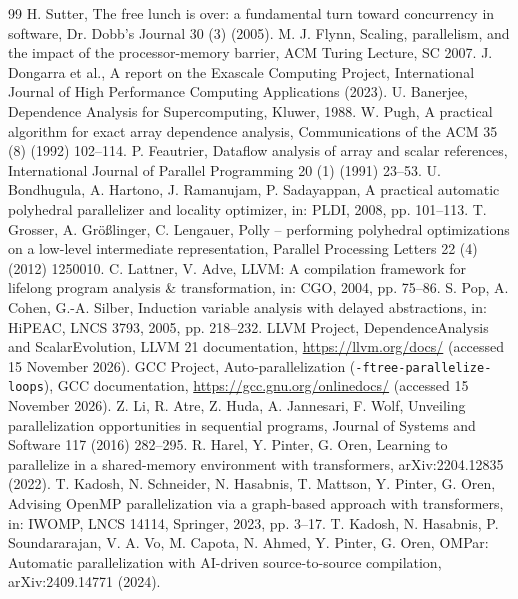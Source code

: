 
\begin{thebibliography}{99}
 H. Sutter, The free lunch is over: a fundamental turn toward concurrency in software, Dr. Dobb's Journal 30 (3) (2005).
 M. J. Flynn, Scaling, parallelism, and the impact of the processor-memory barrier, ACM Turing Lecture, SC 2007.
 J. Dongarra et al., A report on the Exascale Computing Project, International Journal of High Performance Computing Applications (2023).
 U. Banerjee, Dependence Analysis for Supercomputing, Kluwer, 1988.
 W. Pugh, A practical algorithm for exact array dependence analysis, Communications of the ACM 35 (8) (1992) 102--114.
 P. Feautrier, Dataflow analysis of array and scalar references, International Journal of Parallel Programming 20 (1) (1991) 23--53.
 U. Bondhugula, A. Hartono, J. Ramanujam, P. Sadayappan, A practical automatic polyhedral parallelizer and locality optimizer, in: PLDI, 2008, pp. 101--113.
 T. Grosser, A. Gr\"o{\ss}linger, C. Lengauer, Polly -- performing polyhedral optimizations on a low-level intermediate representation, Parallel Processing Letters 22 (4) (2012) 1250010.
 C. Lattner, V. Adve, LLVM: A compilation framework for lifelong program analysis \& transformation, in: CGO, 2004, pp. 75--86.
 S. Pop, A. Cohen, G.-A. Silber, Induction variable analysis with delayed abstractions, in: HiPEAC, LNCS 3793, 2005, pp. 218--232.
 LLVM Project, DependenceAnalysis and ScalarEvolution, LLVM 21 documentation, \url{https://llvm.org/docs/} (accessed 15 November 2026).
 GCC Project, Auto-parallelization (\texttt{-ftree-parallelize-loops}), GCC documentation, \url{https://gcc.gnu.org/onlinedocs/} (accessed 15 November 2026).
 Z. Li, R. Atre, Z. Huda, A. Jannesari, F. Wolf, Unveiling parallelization opportunities in sequential programs, Journal of Systems and Software 117 (2016) 282--295.
 R. Harel, Y. Pinter, G. Oren, Learning to parallelize in a shared-memory environment with transformers, arXiv:2204.12835 (2022).
 T. Kadosh, N. Schneider, N. Hasabnis, T. Mattson, Y. Pinter, G. Oren, Advising OpenMP parallelization via a graph-based approach with transformers, in: IWOMP, LNCS 14114, Springer, 2023, pp. 3--17.
 T. Kadosh, N. Hasabnis, P. Soundararajan, V. A. Vo, M. Capota, N. Ahmed, Y. Pinter, G. Oren, OMPar: Automatic parallelization with AI-driven source-to-source compilation, arXiv:2409.14771 (2024).

\end{thebibliography}
